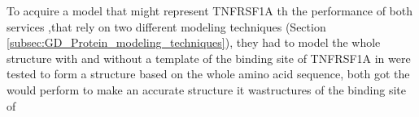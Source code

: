 	
	To acquire a model that might represent TNFRSF1A th the performance of both services ,that rely on two different modeling techniques (Section \ref{subsec:GD_Protein_modeling_techniques}), they had to model the whole structure with and without a template of the binding site of TNFRSF1A in were tested to form a structure based on the whole amino acid sequence, both got the would perform to make an accurate structure it wastructures of the binding site of
%	



	\label{subsubsec:RES_Expanding_Models}



